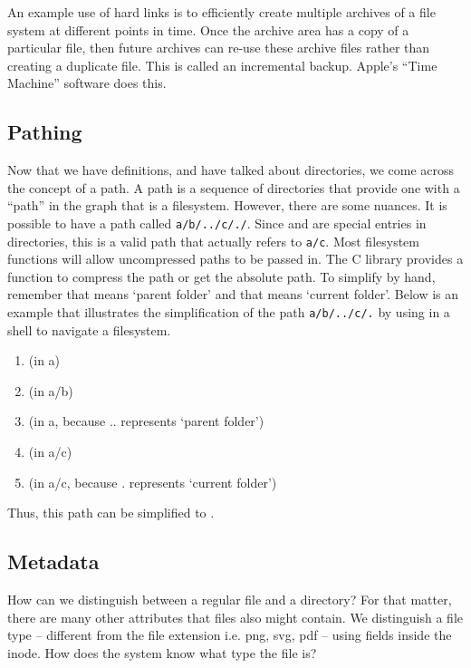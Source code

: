 An example use of hard links is to efficiently create multiple archives of a file system at different points in time.
Once the archive area has a copy of a particular file, then future archives can re-use these archive files rather than creating a duplicate file.
This is called an incremental backup.
Apple's ``Time Machine'' software does this.

\subsection{Pathing}

Now that we have definitions, and have talked about directories, we come across the concept of a path.
A path is a sequence of directories that provide one with a ``path'' in the graph that is a filesystem.
However, there are some nuances.
It is possible to have a path called \texttt{a/b/../c/./}.
Since  and  are special entries in directories, this is a valid path that actually refers to \texttt{a/c}.
Most filesystem functions will allow uncompressed paths to be passed in.
The C library provides a function  to compress the path or get the absolute path.
To simplify by hand, remember that  means `parent folder' and that  means `current folder'.
Below is an example that illustrates the simplification of the path \texttt{a/b/../c/.} by using  in a shell to navigate a filesystem.

\begin{enumerate}
  \item {} (in a)
  \item {} (in a/b)
  \item {} (in a, because .. represents `parent folder')
  \item {} (in a/c)
  \item {} (in a/c, because . represents `current folder')
\end{enumerate}

Thus, this path can be simplified to .

\subsection{Metadata}

How can we distinguish between a regular file and a directory?
For that matter, there are many other attributes that files also might contain.
We distinguish a file type -- different from the file extension i.e. png, svg, pdf -- using fields inside the inode.
How does the system know what type the file is?

